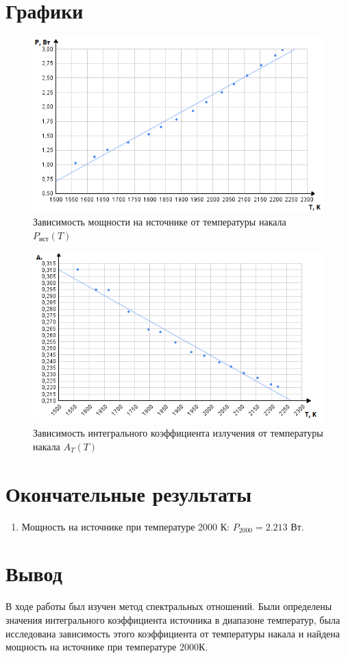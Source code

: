 \documentclass{article}
\begin{document}
\section{Графики}
\begin{figure}[h!]
    \begin{center}
    \includegraphics[scale=0.7]{chart1.png}
    \caption{Зависимость мощности на источнике от температуры накала $ P_{\textit{ист}}(T) $}
    \label{fig:graphUfromI}    
    \end{center}
\end{figure}
\begin{figure}[h!]
    \begin{center}
    \includegraphics[scale=0.7]{chart2.png}
    \caption{Зависимость интегрального коэффициента излучения от температуры накала $ A_{T}(T) $}
    \label{fig:graphUfromI}    
    \end{center}
\end{figure}
\newpage
\section{Окончательные результаты}
\begin{enumerate}
    \item Мощность на источнике при температуре 2000 К: $P_{2000} = 2.213$ Вт.
\end{enumerate}
\newpage
\section{Вывод}
В ходе работы был изучен метод спектральных отношений. Были определены значения интегрального коэффициента источника в диапазоне температур, была исследована зависимость этого коэффициента от температуры накала и найдена мощность на источнике при температуре 2000К.
\end{document}
